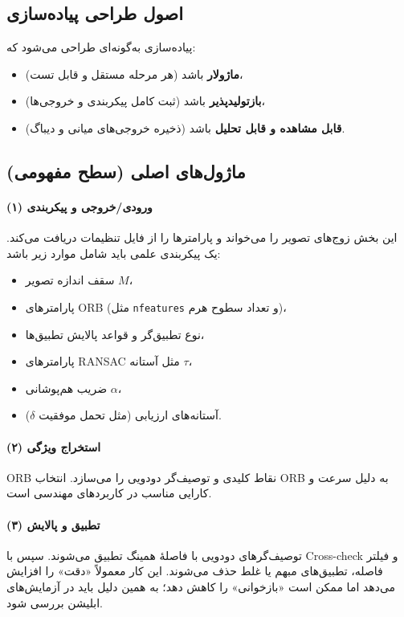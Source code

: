 
\subsection{اصول طراحی پیاده‌سازی}
پیاده‌سازی به‌گونه‌ای طراحی می‌شود که:
\begin{itemize}
  \item \textbf{ماژولار} باشد (هر مرحله مستقل و قابل تست)،
  \item \textbf{بازتولیدپذیر} باشد (ثبت کامل پیکربندی و خروجی‌ها)،
  \item \textbf{قابل مشاهده و قابل تحلیل} باشد (ذخیره خروجی‌های میانی و دیباگ).
\end{itemize}

\subsection{ماژول‌های اصلی (سطح مفهومی)}
\paragraph{(۱) ورودی/خروجی و پیکربندی}
این بخش زوج‌های تصویر را می‌خواند و پارامترها را از فایل تنظیمات دریافت می‌کند. یک پیکربندی علمی باید شامل موارد زیر باشد:
\begin{itemize}
  \item سقف اندازه تصویر $M$،
  \item پارامترهای ORB (مثل \texttt{nfeatures} و تعداد سطوح هرم)،
  \item نوع تطبیق‌گر و قواعد پالایش تطبیق‌ها،
  \item پارامترهای RANSAC مثل آستانه $\tau$،
  \item ضریب هم‌پوشانی $\alpha$،
  \item آستانه‌های ارزیابی (مثل تحمل موفقیت $\delta$).
\end{itemize}

\paragraph{(۲) استخراج ویژگی}
ORB \cite{Rublee2011ORB} نقاط کلیدی و توصیف‌گر دودویی را می‌سازد. انتخاب ORB به دلیل سرعت و کارایی مناسب در کاربردهای مهندسی است.

\paragraph{(۳) تطبیق و پالایش}
توصیف‌گرهای دودویی با فاصلهٔ همینگ تطبیق می‌شوند. سپس با Cross-check و فیلتر فاصله، تطبیق‌های مبهم یا غلط حذف می‌شوند. این کار معمولاً «دقت» را افزایش می‌دهد اما ممکن است «بازخوانی» را کاهش دهد؛ به همین دلیل باید در آزمایش‌های ابلیشن بررسی شود.

